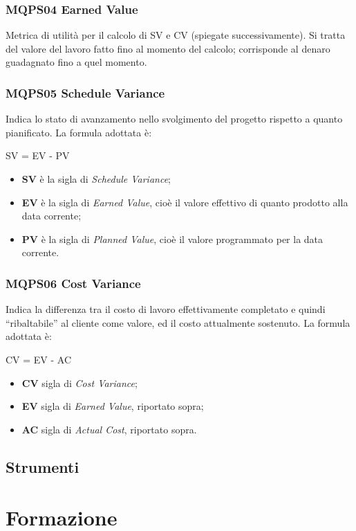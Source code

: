 \subsubsection{MQPS04 Earned Value}\label{4.2.5.4}
Metrica di utilità per il calcolo di SV e CV (spiegate successivamente).
Si tratta del valore del lavoro fatto fino al momento del calcolo;
corrisponde al denaro guadagnato fino a quel momento.

\subsubsection{MQPS05 Schedule Variance}\label{4.2.5.5}
Indica lo stato di avanzamento nello svolgimento del progetto rispetto a quanto pianificato.
La formula adottata è: 
	\begin{center}
		SV = EV - PV
	\end{center}
\begin{itemize}
	\item \textbf{SV} è la sigla di \textit{Schedule Variance};
	\item \textbf{EV} è la sigla di \textit{Earned Value}, cioè il valore effettivo di quanto prodotto alla data corrente;
	\item \textbf{PV} è la sigla di \textit{Planned Value}, cioè il valore programmato per la data corrente.	
\end{itemize}

\subsubsection{MQPS06 Cost Variance}\label{4.2.5.6}
Indica la differenza tra il costo di lavoro effettivamente completato e quindi “ribaltabile” al cliente come valore,  ed il costo attualmente sostenuto.
La formula adottata è:
	\begin{center}
		CV = EV - AC
	\end{center}
\begin{itemize}
	\item \textbf{CV} sigla di \textit{Cost Variance};
	\item \textbf{EV} sigla di \textit{Earned Value}, riportato sopra;
	\item \textbf{AC} sigla di \textit{Actual Cost}, riportato sopra.
\end{itemize}


\subsection{Strumenti}\label{4.2.6}

\section{Formazione}\label{4.3}